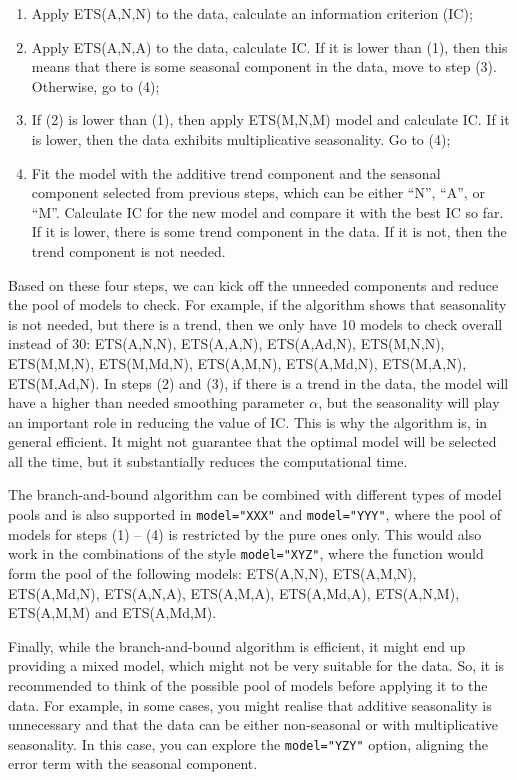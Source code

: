 \documentclass[
]{book}
\providecommand{\tightlist}{%
  \setlength{\itemsep}{0pt}\setlength{\parskip}{0pt}}
\theoremstyle{definition}
\theoremstyle{definition}
\theoremstyle{definition}
\theoremstyle{definition}
\theoremstyle{remark}
\begin{document}
\begin{enumerate}
\def\labelenumi{\arabic{enumi}.}
\tightlist
\item
  Apply ETS(A,N,N) to the data, calculate an information criterion (IC);
\item
  Apply ETS(A,N,A) to the data, calculate IC. If it is lower than (1), then this means that there is some seasonal component in the data, move to step (3). Otherwise, go to (4);
\item
  If (2) is lower than (1), then apply ETS(M,N,M) model and calculate IC. If it is lower, then the data exhibits multiplicative seasonality. Go to (4);
\item
  Fit the model with the additive trend component and the seasonal component selected from previous steps, which can be either ``N'', ``A'', or ``M''. Calculate IC for the new model and compare it with the best IC so far. If it is lower, there is some trend component in the data. If it is not, then the trend component is not needed.
\end{enumerate}

Based on these four steps, we can kick off the unneeded components and reduce the pool of models to check. For example, if the algorithm shows that seasonality is not needed, but there is a trend, then we only have 10 models to check overall instead of 30: ETS(A,N,N), ETS(A,A,N), ETS(A,Ad,N), ETS(M,N,N), ETS(M,M,N), ETS(M,Md,N), ETS(A,M,N), ETS(A,Md,N), ETS(M,A,N), ETS(M,Ad,N). In steps (2) and (3), if there is a trend in the data, the model will have a higher than needed smoothing parameter \(\alpha\), but the seasonality will play an important role in reducing the value of IC. This is why the algorithm is, in general efficient. It might not guarantee that the optimal model will be selected all the time, but it substantially reduces the computational time.

The branch-and-bound algorithm can be combined with different types of model pools and is also supported in \texttt{model="XXX"} and \texttt{model="YYY"}, where the pool of models for steps (1) -- (4) is restricted by the pure ones only. This would also work in the combinations of the style \texttt{model="XYZ"}, where the function would form the pool of the following models: ETS(A,N,N), ETS(A,M,N), ETS(A,Md,N), ETS(A,N,A), ETS(A,M,A), ETS(A,Md,A), ETS(A,N,M), ETS(A,M,M) and ETS(A,Md,M).

Finally, while the branch-and-bound algorithm is efficient, it might end up providing a mixed model, which might not be very suitable for the data. So, it is recommended to think of the possible pool of models before applying it to the data. For example, in some cases, you might realise that additive seasonality is unnecessary and that the data can be either non-seasonal or with multiplicative seasonality. In this case, you can explore the \texttt{model="YZY"} option, aligning the error term with the seasonal component.
\end{document}
